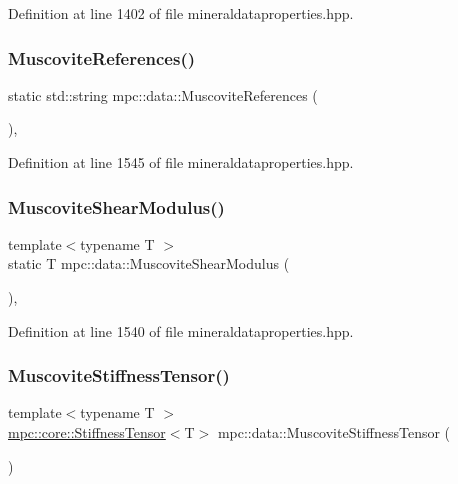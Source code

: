 Definition at line 1402 of file mineraldataproperties.\+hpp.

\mbox{\label{namespacempc_1_1data_aad2c429b249c35ccb88fc81927987f81}} 
\subsubsection{\texorpdfstring{Muscovite\+References()}{MuscoviteReferences()}}
{\footnotesize\ttfamily static std\+::string mpc\+::data\+::\+Muscovite\+References (\begin{DoxyParamCaption}{ }\end{DoxyParamCaption})\hspace{0.3cm}{\ttfamily [inline]}, {\ttfamily [static]}}



Definition at line 1545 of file mineraldataproperties.\+hpp.

\mbox{\label{namespacempc_1_1data_ac3f1ad8a1c5464007e1ec622e72a0fcc}} 
\subsubsection{\texorpdfstring{Muscovite\+Shear\+Modulus()}{MuscoviteShearModulus()}}
{\footnotesize\ttfamily template$<$typename T $>$ \\
static T mpc\+::data\+::\+Muscovite\+Shear\+Modulus (\begin{DoxyParamCaption}{ }\end{DoxyParamCaption})\hspace{0.3cm}{\ttfamily [inline]}, {\ttfamily [static]}}



Definition at line 1540 of file mineraldataproperties.\+hpp.

\mbox{\label{namespacempc_1_1data_a3cdfe643ae316bdfd22f46ab4c9524ee}} 
\subsubsection{\texorpdfstring{Muscovite\+Stiffness\+Tensor()}{MuscoviteStiffnessTensor()}}
{\footnotesize\ttfamily template$<$typename T $>$ \\
\mbox{\hyperlink{structmpc_1_1core_1_1_stiffness_tensor}{mpc\+::core\+::\+Stiffness\+Tensor}}$<$T$>$ mpc\+::data\+::\+Muscovite\+Stiffness\+Tensor (\begin{DoxyParamCaption}{ }\end{DoxyParamCaption})}



